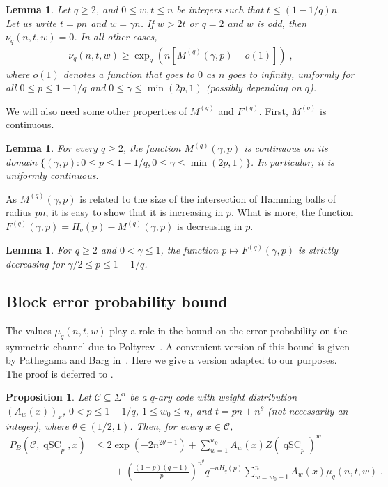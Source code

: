 \documentclass{article}
\DeclareMathOperator{\qSC}{qSC}
\newcommand{\cC}{\mathcal{C}}
\theoremstyle{plain}
\theoremstyle{plain}
\theoremstyle{plain}
\theoremstyle{plain}
\theoremstyle{plain}
\newtheorem{proposition}[definition]{Proposition}%
\theoremstyle{plain}
\theoremstyle{plain}
\newtheorem{lemma}[definition]{Lemma}%
\theoremstyle{plain}
\theoremstyle{plain}
\theoremstyle{plain}
\theoremstyle{remark}
\theoremstyle{remark}
\theoremstyle{remark}
\theoremstyle{plain}
\begin{document}
\begin{lemma} 
\label{lem:nu_t lower bound_general}
Let $q\ge 2$, and $0\le w,t\le n$ be integers
such that $t\le (1-1/q)n$.
Let us write $t=p n$ and $w=\gamma n$. 
If $w>2t$ or $q=2$ and $w$ is odd, then
$\nu_q(n,t,w)=0$. In all other cases,
\begin{align*}
\nu_q(n,t,w)\ge \exp_q\left(n\left[M^{(q)}(\gamma,p)-o(1)\right]
\right)\;,
\end{align*}
where $o(1)$ denotes a function
that goes to $0$ as $n$ goes to infinity,
uniformly for all $0\le p\le 1-1/q$
and $0\le\gamma\le\min(2p,1)$ (possibly depending on $q$).
\end{lemma}

We will also need some other properties
of $M^{(q)}$ and $F^{(q)}$. First, $M^{(q)}$ is continuous.

\begin{lemma}
\label{lem:M_q_continuity}
For every $q\ge 2$, the function $M^{(q)}(\gamma,p)$ is continuous on its domain $\{(\gamma,p): 0\le p\le1-1/q, 0\le \gamma\le\min(2p,1)\}$.
In particular, it is uniformly continuous.
\end{lemma}

As $M^{(q)}(\gamma, p)$ is related to the size
of the intersection of Hamming balls of radius $pn$,
it is easy to show that it is increasing in $p$.
What is more, the function
$F^{(q)}(\gamma, p)=H_q(p)-M^{(q)}(\gamma, p)$
is decreasing in $p$.

\begin{lemma}
\label{lem:fq-decreasing}
For $q\ge 2$ and $0<\gamma\le 1$, the function
$p\mapsto F^{(q)}(\gamma,p)$
is strictly decreasing for $\gamma/2\le p\le 1-1/q$.
\end{lemma}

\subsection{Block error probability bound}

The values $\mu_q(n,t,w)$ play a role
in the bound on the error probability on the
symmetric channel due to Poltyrev~\cite{poltyrev2002bounds}.
A convenient version of this bound is
given by Pathegama and Barg
in~\cite[Proposition 5]{pathegama2023smoothing}. 
Here we give a version adapted to our purposes.
The proof is deferred to .

\begin{proposition}
\label{prop:poltyrev}
    Let $\cC\subseteq\Sigma^n$ be a $q$-ary
    code with weight
    distribution $(A_w(x))_x$,
    $0<p\le 1-1/q$, $1\le w_0\le n$,
    and $t=p n+n^{\theta}$
    (not necessarily an integer), where $\theta\in(1/2,1)$. Then, 
    for every $x\in\cC$,
    \begin{align}
    \label{eq:22}
        P_{B}(\cC,\qSC_p, x)&\le 2\exp\left(-2n^{2\theta-1}\right)+\sum_{w=1}^{w_0}A_w(x)Z(\qSC_p)^w\\
        &\qquad+\left(\frac{(1-p)(q-1)}{p}\right)^{n^\theta}q^{-nH_q(p)}\sum_{w=w_0+1}^{n}A_w(x)\mu_q(n,t,w)\;.
    \label{eq:23}
    \end{align}
\end{proposition}
\end{document}
